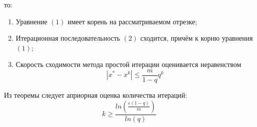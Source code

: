 \documentclass[14pt, a4paper]{article}
\begin{document}
\begin{itemize}
\begin{enumerate}
      \end{enumerate} то:
      \begin{enumerate}
        \item
        Уравнение $(1)$ имеет корень на рассматриваемом отрезке;
        \item
        Итерационная последовательность $(2)$ сходится, причём к корню уравнения $(1)$;
        \item
        Скорость сходимости метода простой итерации оценивается неравенством \begin{equation}|x^* - x^k| \leq \frac{m}{1 - q}q^k\end{equation}
      \end{enumerate}
      Из теоремы следует априорная оценка количества итераций: \begin{equation}k \geq \frac{ln(\frac{\epsilon(1-q)}{m})}{ln(q)}\end{equation}
  \end{itemize}
\end{document}
